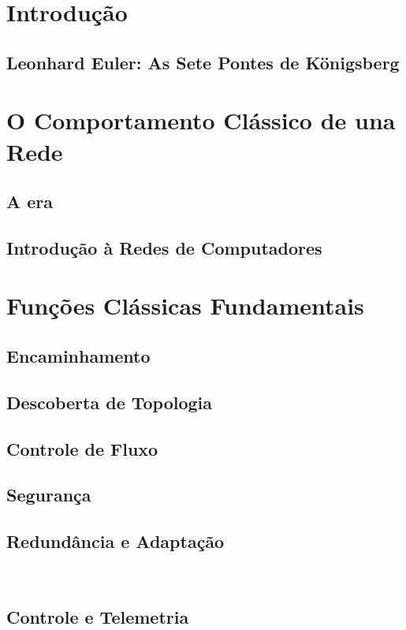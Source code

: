 \documentclass[12pt,a4paper]{article}
\begin{document}
\section{Introdução}
\subsection{Leonhard Euler: As Sete Pontes de Königsberg}


\section{O Comportamento Clássico de una Rede}
\subsection{A era }
\subsection{Introdução à Redes de Computadores}


\section{Funções Clássicas Fundamentais}
\subsection{Encaminhamento}
\subsection{Descoberta de Topologia}
\subsection{Controle de Fluxo}
\subsection{Segurança}
\subsection{Redundância e Adaptação}\
\subsection{Controle e Telemetria}
\end{document}
